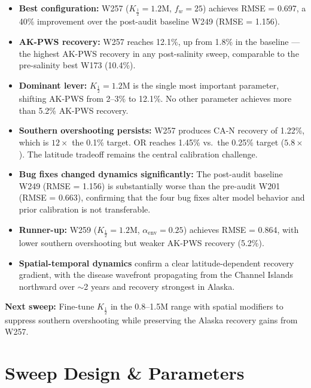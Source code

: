 \documentclass[11pt,a4paper,oneside]{article}
\begin{document}
\begin{itemize}[nosep]
    \item \textbf{Best configuration:} W257 ($K_{\frac{1}{2}} = 1.2\text{M}$, $f_w = 25$) achieves RMSE = 0.697, a 40\% improvement over the post-audit baseline W249 (RMSE = 1.156).
    \item \textbf{AK-PWS recovery:} W257 reaches 12.1\%, up from 1.8\% in the baseline --- the highest AK-PWS recovery in any post-salinity sweep, comparable to the pre-salinity best W173 (10.4\%).
    \item \textbf{Dominant lever:} $K_{\frac{1}{2}} = 1.2\text{M}$ is the single most important parameter, shifting AK-PWS from 2--3\% to 12.1\%. No other parameter achieves more than 5.2\% AK-PWS recovery.
    \item \textbf{Southern overshooting persists:} W257 produces CA-N recovery of 1.22\%, which is $12\times$ the 0.1\% target. OR reaches 1.45\% vs.\ the 0.25\% target ($5.8\times$). The latitude tradeoff remains the central calibration challenge.
    \item \textbf{Bug fixes changed dynamics significantly:} The post-audit baseline W249 (RMSE = 1.156) is substantially worse than the pre-audit W201 (RMSE = 0.663), confirming that the four bug fixes alter model behavior and prior calibration is not transferable.
    \item \textbf{Runner-up:} W259 ($K_{\frac{1}{2}} = 1.2\text{M}$, $\alpha_{\text{env}} = 0.25$) achieves RMSE = 0.864, with lower southern overshooting but weaker AK-PWS recovery (5.2\%).
    \item \textbf{Spatial-temporal dynamics} confirm a clear latitude-dependent recovery gradient, with the disease wavefront propagating from the Channel Islands northward over $\sim$2 years and recovery strongest in Alaska.
\end{itemize}

\noindent\textbf{Next sweep:} Fine-tune $K_{\frac{1}{2}}$ in the 0.8--1.5M range with spatial modifiers to suppress southern overshooting while preserving the Alaska recovery gains from W257.

\clearpage

\section{Sweep Design \& Parameters}
\end{document}
